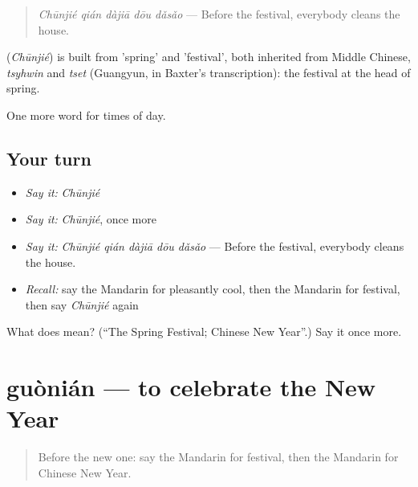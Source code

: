 \begin{quote}
\textbf{} \emph{Chūnjié qián dàjiā dōu dǎsǎo} — Before the festival, everybody cleans the house.
\end{quote}

\begin{cousinweb}
\textbf{} (\emph{Chūnjié}) is built from  'spring' and  'festival', both inherited from Middle Chinese, \emph{tsyhwin} and \emph{tset} (Guangyun, in Baxter's transcription): the festival at the head of spring.
\end{cousinweb}

\begin{grammarlens}[title={What you've built}]
One more word for times of day.
\end{grammarlens}

\subsection*{Your turn}
\begin{itemize}
\raggedright
  \item \emph{Say it:} \emph{Chūnjié}
  \item \emph{Say it:} \emph{Chūnjié}, once more
  \item \emph{Say it:} \emph{Chūnjié qián dàjiā dōu dǎsǎo} — Before the festival, everybody cleans the house.
  \item \emph{Recall:} say the Mandarin for pleasantly cool, then the Mandarin for festival, then say \emph{Chūnjié} again
\end{itemize}

\begin{tcolorbox}[breakable,colback=teal!4,colframe=teal!35!black,title={Before you move on}]
What does  mean? (\textquotedblleft{}The Spring Festival; Chinese New Year\textquotedblright{}.) Say it once more.
\end{tcolorbox}
\section[guònián]{guònián — to celebrate the New Year}

\label{lesson:ZH-C137-guonian}



\begin{quote}
Before the new one: say the Mandarin for festival, then the Mandarin for Chinese New Year.
\end{quote}

